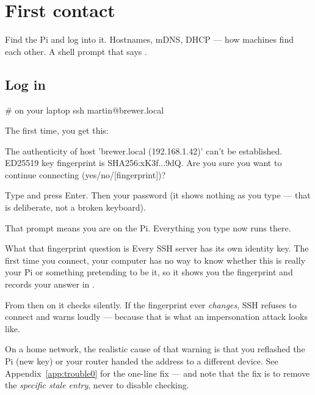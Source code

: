 \chapter{First contact}
\label{ch:contact}

\chapterbrief
  {Find the Pi and log into it.}
  {Hostnames, mDNS, DHCP --- how machines find each other.}
  {A shell prompt that says .}

\section{Log in}

\begin{shell}
# on your laptop
ssh martin@brewer.local
\end{shell}

The first time, you get this:

\begin{trace}
The authenticity of host 'brewer.local (192.168.1.42)' can't be established.
ED25519 key fingerprint is SHA256:xK3f...9dQ.
Are you sure you want to continue connecting (yes/no/[fingerprint])?
\end{trace}

Type \textbf{} and press Enter. Then your password (it shows nothing as
you type --- that is deliberate, not a broken keyboard).


That prompt means you are on the Pi. Everything you type now runs there.

\begin{concept}{What that fingerprint question is}
Every SSH server has its own identity key. The first time you connect, your
computer has no way to know whether this is really your Pi or something
pretending to be it, so it shows you the fingerprint and records your answer in
.

From then on it checks silently. If the fingerprint ever \emph{changes}, SSH
refuses to connect and warns loudly --- because that is what an impersonation
attack looks like.

On a home network, the realistic cause of that warning is that you reflashed the
Pi (new key) or your router handed the address to a different device. See
Appendix~\ref{app:trouble0} for the one-line fix --- and note that the fix is to
remove the \emph{specific stale entry}, never to disable checking.
\end{concept}

